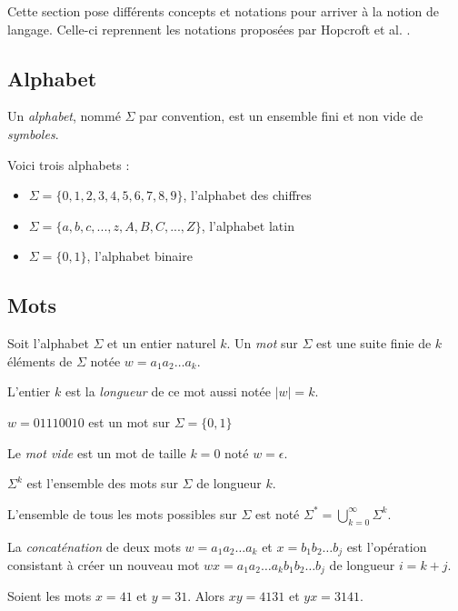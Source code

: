 Cette section pose différents concepts et notations pour arriver à la notion de langage. Celle-ci reprennent les notations proposées par Hopcroft et al. \cite{Hopcroft00}.

\subsection{Alphabet}

Un \emph{alphabet}, nommé $\Sigma$ par convention, est un ensemble fini et non vide de \emph{symboles}.

\begin{example}[Alphabets] Voici trois alphabets : 
	\begin{itemize}
		\item $\Sigma = \{0,1,2,3,4,5,6,7,8,9\}$, l'alphabet des chiffres
		\item $\Sigma = \{a,b,c,...,z,A,B,C,...,Z\}$, l'alphabet latin
		\item $\Sigma = \{0,1\}$, l'alphabet binaire
	\end{itemize}
\end{example}


\subsection{Mots}

Soit l'alphabet $\Sigma$ et un entier naturel $k$. Un \emph{mot} sur $\Sigma$ est une suite finie de $k$ éléments de $\Sigma$ notée $ w = a_1a_2\dots a_k $.

L'entier $k$ est la \emph{longueur} de ce mot aussi notée $|w|=k$.

\begin{example}[Mot]
	$w=01110010$ est un mot sur $\Sigma=\{0,1\}$
\end{example}


Le \emph{mot vide} est un mot de taille $k=0$ noté $w=\epsilon$.

$\Sigma^k$ est l'ensemble des mots sur $\Sigma$ de longueur $k$.
	
L'ensemble de tous les mots possibles sur $\Sigma$ est noté $\Sigma^* = \bigcup_{k=0}^{\infty}\Sigma^k$.

La \emph{concaténation} de deux mots $w=a_1a_2\dots a_k$ et $x=b_1b_2\dots b_j$ est l'opération consistant à créer un nouveau mot $wx=a_1a_2\dots a_kb_1b_2\dots b_j$ de longueur $i=k+j$.

\begin{example}[Concaténation]
	Soient les mots $x=41$ et $y=31$. Alors $xy=4131$ et $yx=3141$.
\end{example}


